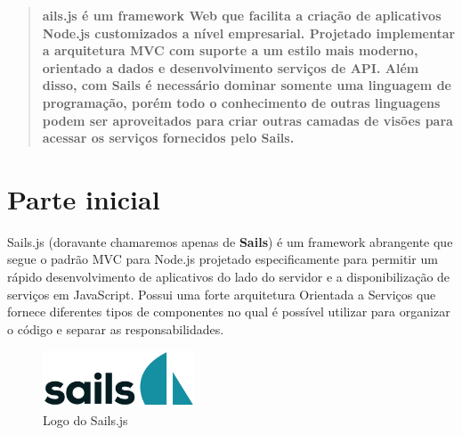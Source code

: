 \documentclass[a4paper,11pt]{article}
\begin{document}
	
	\maketitle %
	\thispagestyle{fancy} %
	

\begin{abstract}
\textbf{ails.js\cite{sailsoficial} é um framework Web que facilita 
a criação de aplicativos Node.js customizados a nível empresarial. Projetado implementar a arquitetura MVC com suporte a um estilo mais moderno, orientado a dados e desenvolvimento serviços de API. Além disso, com Sails é necessário dominar somente uma linguagem de programação, porém todo o conhecimento de outras linguagens podem ser aproveitados para criar outras camadas de visões para acessar os serviços fornecidos pelo Sails.}
\end{abstract}
\vspace{20pt}

\section{Parte inicial}
Sails.js (doravante chamaremos apenas de \textbf{Sails}) é um framework abrangente que segue o padrão MVC para Node.js projetado especificamente para permitir um rápido desenvolvimento de aplicativos do lado do servidor e a disponibilização de serviços em JavaScript. Possui uma forte arquitetura Orientada a Serviços que fornece diferentes tipos de componentes no qual é possível utilizar para organizar o código e separar as responsabilidades. 
\begin{figure}[H]
	\centering
	\includegraphics[width=0.4\textwidth]{imagens/sails.png}
	\caption{Logo do Sails.js}
\end{figure}
\end{document}
